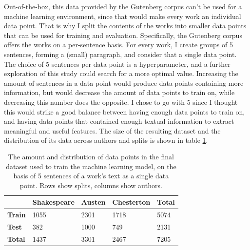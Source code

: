 \documentclass{article}
\begin{document}
Out-of-the-box, this data provided by the Gutenberg corpus can't be used for a machine learning environment, since that would make every work an individual data point.
That is why I split the contents of the works into smaller data points that can be used for training and evaluation.
Specifically, the Gutenberg corpus offers the works on a per-sentence basis.
For every work, I create groups of 5 sentences, forming a (small) paragraph, and consider that a single data point.
The choice of 5 sentences per data point is a hyperparameter, and a further exploration of this study could search for a more optimal value.
Increasing the amount of sentences in a data point would produce data points containing more information, but would decrease the amount of data points to train on, while decreasing this number does the opposite.
I chose to go with 5 since I thought this would strike a good balance between having enough data points to train on, and having data points that contained enough textual information to extract meaningful and useful features.
The size of the resulting dataset and the distribution of its data across authors and splits is shown in table \ref{tab:dataset}.

\begin{table}[]
\centering
\begin{tabular}{l|lll|l}
                & \textbf{Shakespeare} & \textbf{Austen} & \textbf{Chesterton} & \textbf{Total} \\ \hline
  \textbf{Train} & 1055                 & 2301            & 1718                & 5074           \\
  \textbf{Test}  & 382                  & 1000            & 749                 & 2131           \\ \hline
  \textbf{Total} & 1437                 & 3301            & 2467                & 7205          
\end{tabular}%
\caption{The amount and distribution of data points in the final dataset used to train the machine learning model, on the basis of 5 sentences of a work's text as a single data point. Rows show splits, columns show authors.}
\label{tab:dataset}
\end{table}
\end{document}
